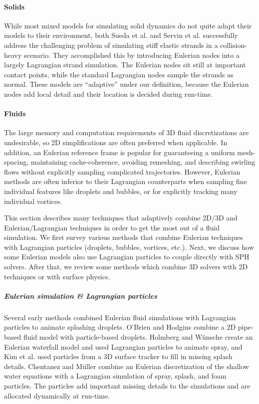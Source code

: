 \paragraph{Solids}
While most mixed models for simulating solid dynamics do not quite adapt their models to their environment, both Sueda et al. \cite{Sueda2011} and Servin et al. \cite{Servin2011} successfully address the challenging problem of simulating stiff elastic strands in a collision-heavy scenario. They accomplished this by introducing Eulerian nodes into a largely Lagrangian strand simulation. The Eulerian nodes sit still at important contact points, while the standard Lagrangian nodes sample the strands as normal. These models are ``adaptive'' under our definition, because the Eulerian nodes add local detail and their location is decided during run-time.


\paragraph{Fluids}
The large memory and computation requirements of 3D fluid discretizations are undesirable, so 2D simplifications are often preferred when applicable. In addition, an Eulerian reference frame is popular for guaranteeing a uniform mesh-spacing, maintaining cache-coherence, avoiding remeshing, and describing swirling flows without explicitly sampling complicated trajectories. However, Eulerian methods are often inferior to their Lagrangian counterparts when sampling fine individual features like droplets and bubbles, or for explicitly tracking many individual vortices.

This section describes many techniques that adaptively combine 2D/3D and Eulerian/Lagrangian techniques in order to get the most out of a fluid simulation. We first survey various methods that combine Eulerian techniques with Lagrangian particles (droplets, bubbles, vortices, etc.). Next, we discuss how some Eulerian models also use Lagrangian particles to couple directly with SPH solvers. After that, we review some methods which combine 3D solvers with 2D techniques or with surface physics.

\subparagraph*{Eulerian simulation \& Lagrangian particles}

Several early methods combined Eulerian fluid simulations with Lagrangian particles to animate splashing droplets. O'Brien and Hodgins \cite{OBrien1995} combine a 2D pipe-based fluid model with particle-based droplets. Holmberg and W\"unsche \cite{Holmberg2004} create an Eulerian waterfall model and used Lagrangian particles to animate spray, and Kim et al. \cite{Kim2006:Splash} used particles from a 3D surface tracker to fill in missing splash details. Chentanez and M\"uller \cite{Chentanez2010} combine an Eulerian discretization of the shallow water equations with a Lagrangian simulation of spray, splash, and foam particles. The particles add important missing details to the simulations and are allocated dynamically at run-time.

